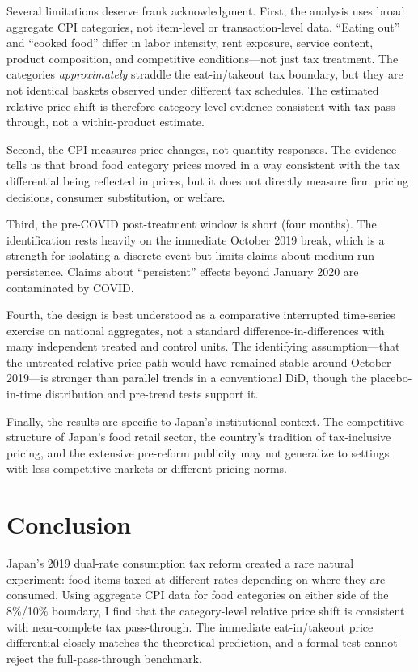 \documentclass[12pt]{article}
\begin{document}
Several limitations deserve frank acknowledgment. First, the analysis uses broad aggregate CPI categories, not item-level or transaction-level data. ``Eating out'' and ``cooked food'' differ in labor intensity, rent exposure, service content, product composition, and competitive conditions---not just tax treatment. The categories \textit{approximately} straddle the eat-in/takeout tax boundary, but they are not identical baskets observed under different tax schedules. The estimated relative price shift is therefore category-level evidence consistent with tax pass-through, not a within-product estimate.

Second, the CPI measures price changes, not quantity responses. The evidence tells us that broad food category prices moved in a way consistent with the tax differential being reflected in prices, but it does not directly measure firm pricing decisions, consumer substitution, or welfare.

Third, the pre-COVID post-treatment window is short (four months). The identification rests heavily on the immediate October 2019 break, which is a strength for isolating a discrete event but limits claims about medium-run persistence. Claims about ``persistent'' effects beyond January 2020 are contaminated by COVID.

Fourth, the design is best understood as a comparative interrupted time-series exercise on national aggregates, not a standard difference-in-differences with many independent treated and control units. The identifying assumption---that the untreated relative price path would have remained stable around October 2019---is stronger than parallel trends in a conventional DiD, though the placebo-in-time distribution and pre-trend tests support it.

Finally, the results are specific to Japan's institutional context. The competitive structure of Japan's food retail sector, the country's tradition of tax-inclusive pricing, and the extensive pre-reform publicity may not generalize to settings with less competitive markets or different pricing norms.


\section{Conclusion}
\label{sec:conclusion}

Japan's 2019 dual-rate consumption tax reform created a rare natural experiment: food items taxed at different rates depending on where they are consumed. Using aggregate CPI data for food categories on either side of the 8\%/10\% boundary, I find that the category-level relative price shift is consistent with near-complete tax pass-through. The immediate eat-in/takeout price differential closely matches the theoretical prediction, and a formal test cannot reject the full-pass-through benchmark.
\end{document}
